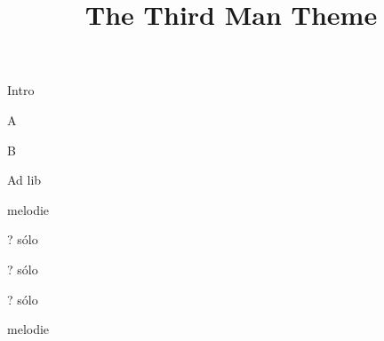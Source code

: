\documentclass[timestamp]{jazzgrid}
\title{The Third Man Theme}
\begin{document}
\maketitle

\begin{musicsection}{Intro}
\barline
	{}
	{}
	{}
	{}
	{}
\end{musicsection}

\begin{musicsection}{A}
\barline
	{}
	{\barfour{}{}{}{}{}}
	{}
	{\barfour{}{}{}{}{}}
\barline
	{}
	{\barfour{}{}{}{}{}}
	{}
	{\barfour{}{}{}{}{}}
\barline
	{}
	{\barfour{}{}{}{}{}}
	{}
	{\barfour{}{}{}{}{}}
\barline
	{}
	{\barfour{}{}{}{}{}}
	{}
	{}
\end{musicsection}

\begin{musicsection}{B}
\barline
	{}
	{\barfour{}{}{}{}{}}
	{}
	{\barfour{}{}{}{}{}}
\barline
	{}
	{\barfour{}{}{}{}{}}
	{}
	{\barfour{}{}{}{}{}}
\barline
	{}
	{\barfour{}{}{}{}{}}
	{}
	{}
\barline
	{}
	{}
	{}
	{}
\end{musicsection}

\footnotesize
\begin{description}[noitemsep,align=right,labelwidth=\widthof{\bfseries{$2\times$AB}}]
	\item [Intro] Ad lib
	\item [AB] melodie
	\item [$2\times$AB] ? sólo
	\item [$2\times$AB] ? sólo
	\item [$2\times$AB] ? sólo
	\item [AB] melodie
\end{description}
\end{document}
